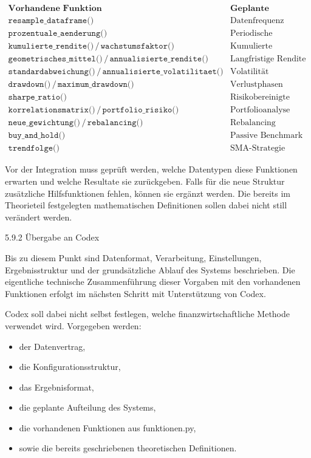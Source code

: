 \documentclass[
  ngerman,
  a4paper,
  DIV=11,
  oneside]{scrreprt}
\providecommand{\tightlist}{%
  \setlength{\itemsep}{0pt}\setlength{\parskip}{0pt}}
\begin{document}
\[
\begin{array}{l|l}
\textbf{Vorhandene Funktion} & \textbf{Geplante Verwendung} \\
\hline
\texttt{resample\_dataframe()} & \text{Datenfrequenz anpassen} \\
\texttt{prozentuale\_aenderung()} & \text{Periodische Renditen} \\
\texttt{kumulierte\_rendite()} \,/\, \texttt{wachstumsfaktor()} & \text{Kumulierte Entwicklung} \\
\texttt{geometrisches\_mittel()} \,/\, \texttt{annualisierte\_rendite()} & \text{Langfristige Rendite} \\
\texttt{standardabweichung()} \,/\, \texttt{annualisierte\_volatilitaet()} & \text{Volatilität} \\
\texttt{drawdown()} \,/\, \texttt{maximum\_drawdown()} & \text{Verlustphasen} \\
\texttt{sharpe\_ratio()} & \text{Risikobereinigte Rendite} \\
\texttt{korrelationsmatrix()} \,/\, \texttt{portfolio\_risiko()} & \text{Portfolioanalyse} \\
\texttt{neue\_gewichtung()} \,/\, \texttt{rebalancing()} & \text{Rebalancing} \\
\texttt{buy\_and\_hold()} & \text{Passive Benchmark} \\
\texttt{trendfolge()} & \text{SMA-Strategie}
\end{array}
\]

Vor der Integration muss geprüft werden, welche Datentypen diese
Funktionen erwarten und welche Resultate sie zurückgeben. Falls für die
neue Struktur zusätzliche Hilfsfunktionen fehlen, können sie ergänzt
werden. Die bereits im Theorieteil festgelegten mathematischen
Definitionen sollen dabei nicht still verändert werden.

5.9.2 Übergabe an Codex

Bis zu diesem Punkt sind Datenformat, Verarbeitung, Einstellungen,
Ergebnisstruktur und der grundsätzliche Ablauf des Systems beschrieben.
Die eigentliche technische Zusammenführung dieser Vorgaben mit den
vorhandenen Funktionen erfolgt im nächsten Schritt mit Unterstützung von
Codex.

Codex soll dabei nicht selbst festlegen, welche finanzwirtschaftliche
Methode verwendet wird. Vorgegeben werden:

\begin{itemize}
\tightlist
\item
  der Datenvertrag,
\item
  die Konfigurationsstruktur,
\item
  das Ergebnisformat,
\item
  die geplante Aufteilung des Systems,
\item
  die vorhandenen Funktionen aus funktionen.py,
\item
  sowie die bereits geschriebenen theoretischen Definitionen.
\end{itemize}
\end{document}
